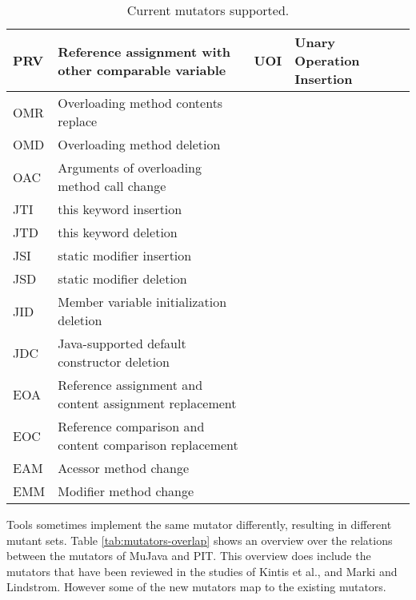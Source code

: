 \documentclass[../main]{subfiles}
\begin{document}
\begin{table}[htb]
\begin{tabular}{|l|l|l|l|}
PRV & Reference assignment   with other comparable variable     & UOI                   & Unary Operation Insertion       \\ \hline
OMR & Overloading method   contents replace                     & \multicolumn{1}{l|}{} &                                 \\ \hline
OMD & Overloading method   deletion                             & \multicolumn{1}{l|}{} &                                 \\ \hline
OAC & Arguments of   overloading method call change             & \multicolumn{1}{l|}{} &                                 \\ \hline
JTI & this keyword insertion                                    & \multicolumn{1}{l|}{} &                                 \\ \hline
JTD & this keyword deletion                                     & \multicolumn{1}{l|}{} &                                 \\ \hline
JSI & static modifier   insertion                               & \multicolumn{1}{l|}{} &                                 \\ \hline
JSD & static modifier   deletion                                & \multicolumn{1}{l|}{} &                                 \\ \hline
JID & Member variable   initialization deletion                 & \multicolumn{1}{l|}{} &                                 \\ \hline
JDC & Java-supported default   constructor deletion             & \multicolumn{1}{l|}{} &                                 \\ \hline
EOA & Reference assignment   and content assignment replacement & \multicolumn{1}{l|}{} &                                 \\ \hline
EOC & Reference comparison   and content comparison replacement & \multicolumn{1}{l|}{} &                                 \\ \hline
EAM & Acessor method change                                     & \multicolumn{1}{l|}{} &                                 \\ \hline
EMM & Modifier method change                                    & \multicolumn{1}{l|}{} &                                 \\ \hline
\end{tabular}
\caption{\label{tab:mutators-current}Current mutators supported.}
\end{table}
\newpage
Tools sometimes implement the same mutator differently, resulting in different mutant sets. Table \ref{tab:mutators-overlap} shows an overview over the relations between the mutators of MuJava and PIT. This overview does include the mutators that have been reviewed in the studies of Kintis et al., and Marki and Lindstrom. However some of the new mutators map to the existing mutators.
\end{document}
